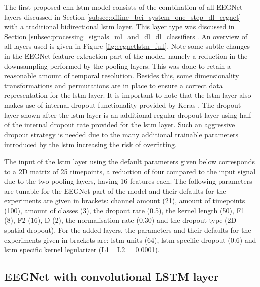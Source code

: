 The first proposed \gls{cnn}-\gls{lstm} model consists of the combination of all EEGNet layers discussed in Section \ref{subsec:offline_bci_system_one_step_dl_eegnet} with a traditional bidirectional \gls{lstm} layer.
This layer type was discussed in Section \ref{subsec:processing_signals_ml_and_dl_dl_classifiers}.
An overview of all layers used is given in Figure \ref{fig:eegnetlstm_full}.
Note some subtle changes in the EEGNet feature extraction part of the model, namely a reduction in the downsampling performed by the pooling layers.
This was done to retain a reasonable amount of temporal resolution.
Besides this, some dimensionality transformations and permutations are in place to ensure a correct data representation for the \gls{lstm} layer.
It is important to note that the \gls{lstm} layer also makes use of internal dropout functionality provided by Keras \citep{keras}.
The dropout layer shown after the \gls{lstm} layer is an additional regular dropout layer using half of the internal dropout rate provided for the \gls{lstm} layer.
Such an aggressive dropout strategy is needed due to the many additional trainable parameters introduced by the \gls{lstm} increasing the risk of overfitting.

The input of the \gls{lstm} layer using the default parameters given below corresponds to a 2D matrix of 25 timepoints, a reduction of four compared to the input signal due to the two pooling layers, having 16 features each.
The following parameters are tunable for the EEGNet part of the model and their defaults for the experiments are given in brackets: channel amount (21), amount of timepoints (100), amount of classes (3), the dropout rate (0.5), the kernel length (50), F1 (8), F2 (16), D (2), the normalisation rate (0.30) and the dropout type (2D spatial dropout).
For the added layers, the parameters and their defaults for the experiments given in brackets are: \gls{lstm} units (64), \gls{lstm} specific dropout (0.6) and \gls{lstm} specific kernel legularizer (L1= L2 = 0.0001).


\subsection{EEGNet with convolutional LSTM layer}
\label{subsec:offline_bci_system_adding_memory_convlstm_eegnet}

